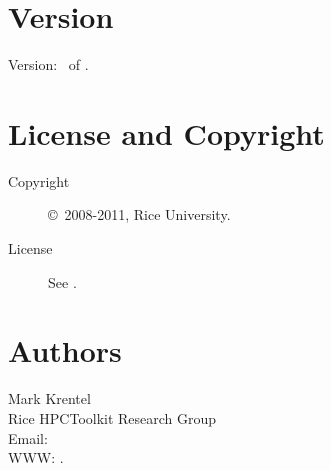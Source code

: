 \documentclass[english]{article}
\begin{document}
\section{Version}

Version: \Version\ of \Date.

\section{License and Copyright}

\begin{description}
\item[Copyright] \copyright\ 2008-2011, Rice University.
\item[License] See .
\end{description}

\section{Authors}

\noindent
Mark Krentel \\
Rice HPCToolkit Research Group \\
Email:  \\
WWW: .

\LatexManEnd
\end{document}
